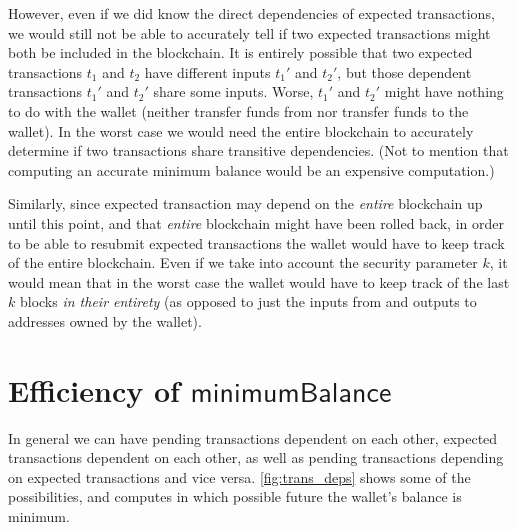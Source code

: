 \documentclass{article}
\theoremstyle{definition}{
  \newtheorem{lemma}{Lemma}[section] %
  \newtheorem{definition}[lemma]{Definition}
}
\theoremstyle{theorem}{
  \newtheorem{invariant}[lemma]{Invariant}
  \newtheorem{proofobligation}[lemma]{Proof Obligation}
}
\numberwithin{equation}{lemma}
\begin{document}
However, even if we did know the direct dependencies of expected transactions,
we would still not be able to accurately tell if two expected transactions might
both be included in the blockchain. It is entirely possible that two expected
transactions $t_1$ and $t_2$ have different inputs $t_1'$ and $t_2'$, but those
dependent transactions $t_1'$ and $t_2'$ share some inputs. Worse, $t_1'$ and
$t_2'$ might have nothing to do with the wallet (neither transfer funds from nor
transfer funds to the wallet). In the worst case we would need the entire
blockchain to  accurately determine if two transactions share transitive
dependencies. (Not to mention that computing an accurate minimum balance
would be an expensive computation.)

Similarly, since expected transaction may depend on the \emph{entire} blockchain
up until this point, and that \emph{entire} blockchain might have been rolled
back, in order to be able to resubmit expected transactions the wallet would
have to keep track of the entire blockchain. Even if we take into account the
security parameter $k$, it would mean that in the worst case the wallet would
have to keep track of the last $k$ blocks \emph{in their entirety} (as opposed
to just the inputs from and outputs to addresses owned by the wallet).

\section{Efficiency of $\mathsf{minimumBalance}$}
\label{sec:computing_minimum_balance}

In general we can have pending transactions dependent on each other, expected
transactions dependent on each other, as well as pending transactions depending
on expected transactions and vice versa. \cref{fig:trans_deps} shows
some of the possibilities, and computes in which possible future the wallet's
balance is minimum.
\end{document}
